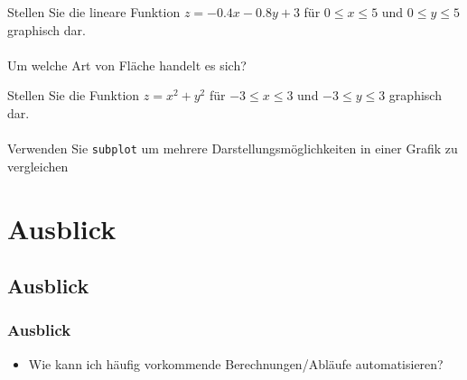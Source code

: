     \secMexercise
    \begin{frame}
        \frameMexercise
        \begin{exercise}
            \sloppy
            Stellen Sie die lineare Funktion $z = -0.4x -0.8y + 3$ für $0 \leq x \leq 5$ und $0 \leq y \leq 5$ graphisch dar. \\ \\

            Um welche Art von Fläche handelt es sich?
        \end{exercise}
    \end{frame}

    \secMexercise
    \begin{frame}
        \frameMexercise
        \begin{exercise}
            \sloppy
            Stellen Sie die Funktion $z = x^{2} + y^{2}$ für $-3 \leq x \leq 3$ und $-3 \leq y \leq 3$ graphisch dar. \\ \\
            Verwenden Sie \texttt{subplot} um mehrere Darstellungsmöglichkeiten in einer Grafik zu vergleichen
        \end{exercise}
    \end{frame}

    \section{Ausblick}
    \subsection{Ausblick}
    \begin{frame}
        \frametitle{Ausblick}
        \begin{itemize}
            \item Wie kann ich häufig vorkommende Berechnungen/Abläufe automatisieren?
        \end{itemize}
    \end{frame}



